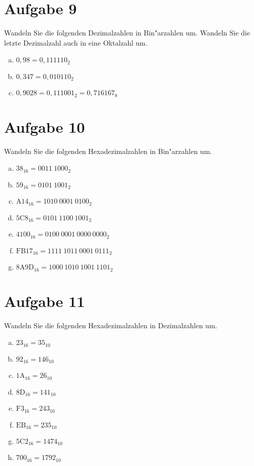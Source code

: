\documentclass[10pt, oneside]{article}
\begin{document}
\section{Aufgabe 9}
Wandeln Sie die folgenden Dezimalzahlen in Bin"arzahlen um. Wandeln Sie die
letzte Dezimalzahl auch in eine Oktalzahl um.
\begin{enumerate}[(a)]
    \item $0,98 = 0,111110_2$
    \item $0,347 = 0,010110_2$
    \item $0,9028 = 0,111001_2 = 0,716167_8$
\end{enumerate}

\section{Aufgabe 10}
Wandeln Sie die folgenden Hexadezimalzahlen in Bin"arzahlen um.
\begin{enumerate}[(a)]
    \item $38_{16} = 0011\ 1000_2$
    \item $59_{16} = 0101\ 1001_2$
    \item $\text{A}14_{16} = 1010\ 0001\ 0100_2$
    \item $5\text{C}8_{16} = 0101\ 1100\ 1001_2$
    \item $4100_{16} = 0100\ 0001\ 0000\ 0000_2$
    \item $\text{FB}17_{16} = 1111\ 1011\ 0001\ 0111_2$
    \item $8\text{A}9\text{D}_{16} = 1000\ 1010\ 1001\ 1101_2$
\end{enumerate}

\pagebreak
\section{Aufgabe 11}
Wandeln Sie die folgenden Hexadezimalzahlen in Dezimalzahlen um.
\begin{enumerate}[(a)]
    \item $23_{16} = 35_{10}$
    \item $92_{16} = 146_{10}$
    \item $1\text{A}_{16} = 26_{10}$
    \item $8\text{D}_{16} = 141_{10}$
    \item $\text{F}3_{16} = 243_{10}$
    \item $\text{EB}_{16} = 235_{10}$
    \item $5\text{C}2_{16} = 1474_{10}$
    \item $700_{16} = 1792_{10}$
\end{enumerate}
\end{document}
